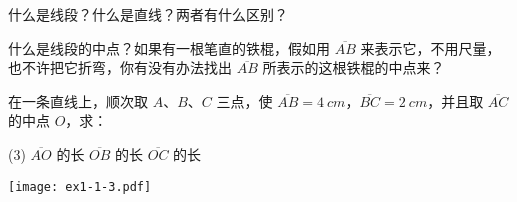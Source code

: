 \begin{Exercise}
\begin{question}
	\item 什么是线段？什么是直线？两者有什么区别？
	\item 什么是线段的中点？如果有一根笔直的铁棍，假如用 $\overline{AB}$ 来表示它，不用尺量，也不许把它折弯，你有没有办法找出 $\overline{AB}$ 所表示的这根铁棍的中点来？


\item\label{exec:1-1-3} 在一条直线上，顺次取 $A$、$B$、$C$ 三点，使 $\overline{AB}=\qty{4}{cm}$，$\overline{BC}=\qty{2}{cm}$，并且取 $\overline{AC}$ 的中点 $O$，求：
	\begin{tasks}(3)
		\task $\overline{AO}$ 的长
		\task $\overline{OB}$ 的长
		\task $\overline{OC}$ 的长
	\end{tasks}

\begin{figurehere}
	\begin{minipage}{\linewidth}\centering
		\texttt{[image: ex1-1-3.pdf]}
		\caption*{第 \ref{exec:1-1-3} 题}
	\end{minipage}
\end{figurehere}


\end{question}
\end{Exercise}
